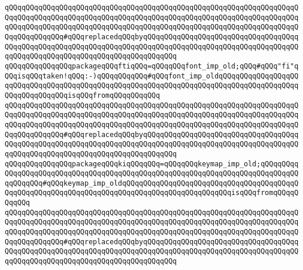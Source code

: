 \verb|qQQqqQQqqQQqqQQqqQQqqQQqqQQqqQQqqQQqqQQqqQQqqQQqqQQqqQQqqQQqqQQqqQQqqQQqqQQqqQQqqQQqqQQqqQQqqQQqqQQqqQQqqQQqqQQqqQQqqQQqqQQqqQQqqQQqqQQqqQQqqQQqqQQqqQQqqQQqqQQqqQQqqQQqqQQqqQQqqQQqqQQqqQQqqQQqqQQqqQQqqQQqqQQqqQQqqQQqqQQqqQQq#qQQqreplacedqQQqbyqQQqqQQqqQQqqQQqqQQqqQQqqQQqqQQqqQQqqQQqqQQqqQQqqQQqqQQqqQQqqQQqqQQqqQQqqQQqqQQqqQQqqQQqqQQqqQQqqQQqqQQqqQQqqQQqqQQqqQQqqQQqqQQqqQQqqQQqqQQqqQQqqQQq|\newline
\newline
\verb|qQQqqQQqqQQqqQQqpackageqQQqftiqQQq=qQQqqQQqfont_imp_old;qQQq#qQQq"fi"qQQqisqQQqtaken!qQQq:-)qQQqqQQqqQQq#qQQqfont_imp_oldqQQqqQQqqQQqqQQqqQQqqQQqqQQqqQQqqQQqqQQqqQQqqQQqqQQqqQQqqQQqqQQqqQQqqQQqqQQqqQQqqQQqqQQqqQQqqQQqqQQqqQQqisqQQqfromqQQqqQQqqQQq|\newline
\verb|qQQqqQQqqQQqqQQqqQQqqQQqqQQqqQQqqQQqqQQqqQQqqQQqqQQqqQQqqQQqqQQqqQQqqQQqqQQqqQQqqQQqqQQqqQQqqQQqqQQqqQQqqQQqqQQqqQQqqQQqqQQqqQQqqQQqqQQqqQQqqQQqqQQqqQQqqQQqqQQqqQQqqQQqqQQqqQQqqQQqqQQqqQQqqQQqqQQqqQQqqQQqqQQqqQQqqQQqqQQqqQQq#qQQqreplacedqQQqbyqQQqqQQqqQQqqQQqqQQqqQQqqQQqqQQqqQQqqQQqqQQqqQQqqQQqqQQqqQQqqQQqqQQqqQQqqQQqqQQqqQQqqQQqqQQqqQQqqQQqqQQqqQQqqQQqqQQqqQQqqQQqqQQqqQQqqQQqqQQqqQQqqQQq|\newline
\newline
\verb|qQQqqQQqqQQqqQQqpackageqQQqkiqQQqqQQq=qQQqqQQqkeymap_imp_old;qQQqqQQqqQQqqQQqqQQqqQQqqQQqqQQqqQQqqQQqqQQqqQQqqQQqqQQqqQQqqQQqqQQqqQQqqQQqqQQqqQQqqQQq#qQQqkeymap_imp_oldqQQqqQQqqQQqqQQqqQQqqQQqqQQqqQQqqQQqqQQqqQQqqQQqqQQqqQQqqQQqqQQqqQQqqQQqqQQqqQQqqQQqqQQqqQQqqQQqisqQQqfromqQQqqQQqqQQq|\newline
\verb|qQQqqQQqqQQqqQQqqQQqqQQqqQQqqQQqqQQqqQQqqQQqqQQqqQQqqQQqqQQqqQQqqQQqqQQqqQQqqQQqqQQqqQQqqQQqqQQqqQQqqQQqqQQqqQQqqQQqqQQqqQQqqQQqqQQqqQQqqQQqqQQqqQQqqQQqqQQqqQQqqQQqqQQqqQQqqQQqqQQqqQQqqQQqqQQqqQQqqQQqqQQqqQQqqQQqqQQqqQQqqQQq#qQQqreplacedqQQqbyqQQqqQQqqQQqqQQqqQQqqQQqqQQqqQQqqQQqqQQqqQQqqQQqqQQqqQQqqQQqqQQqqQQqqQQqqQQqqQQqqQQqqQQqqQQqqQQqqQQqqQQqqQQqqQQqqQQqqQQqqQQqqQQqqQQqqQQqqQQqqQQqqQQq|\newline
